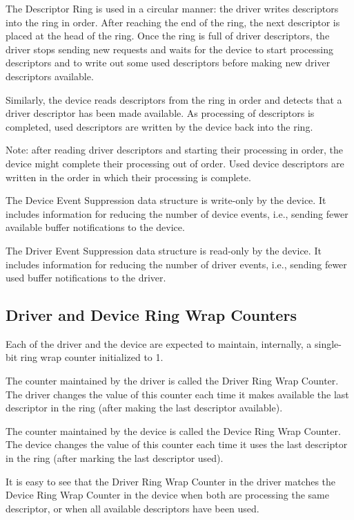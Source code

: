 The Descriptor Ring is used in a circular manner: the driver writes
descriptors into the ring in order. After reaching the end of the ring,
the next descriptor is placed at the head of the ring.  Once the ring is
full of driver descriptors, the driver stops sending new requests and
waits for the device to start processing descriptors and to write out
some used descriptors before making new driver descriptors
available.

Similarly, the device reads descriptors from the ring in order and
detects that a driver descriptor has been made available.  As
processing of descriptors is completed, used descriptors are
written by the device back into the ring.

Note: after reading driver descriptors and starting their
processing in order, the device might complete their processing out
of order.  Used device descriptors are written in the order
in which their processing is complete.

The Device Event Suppression data structure is write-only by the
device. It includes information for reducing the number of
device events, i.e., sending fewer available buffer notifications
to the device.

The Driver Event Suppression data structure is read-only by the
device. It includes information for reducing the number of
driver events, i.e., sending fewer used buffer notifications 
to the driver.

\subsection{Driver and Device Ring Wrap Counters}
\label{sec:Packed Virtqueues / Driver and Device Ring Wrap Counters}
Each of the driver and the device are expected to maintain,
internally, a single-bit ring wrap counter initialized to 1.

The counter maintained by the driver is called the Driver
Ring Wrap Counter. The driver changes the value of this counter
each time it makes available the
last descriptor in the ring (after making the last descriptor
available).

The counter maintained by the device is called the Device Ring Wrap
Counter.  The device changes the value of this counter
each time it uses the last descriptor in
the ring (after marking the last descriptor used).

It is easy to see that the Driver Ring Wrap Counter in the driver matches
the Device Ring Wrap Counter in the device when both are processing the same
descriptor, or when all available descriptors have been used.

